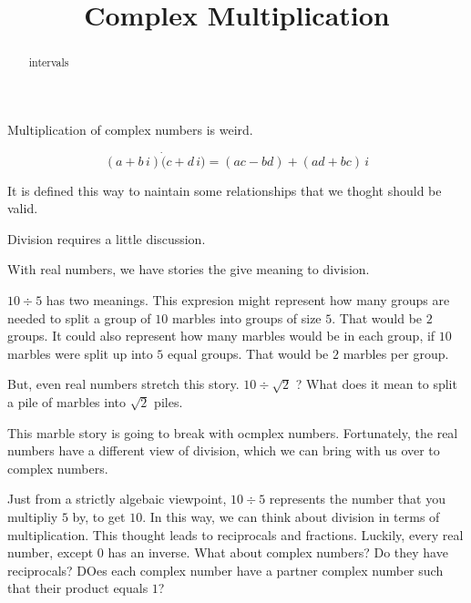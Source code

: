 \documentclass{ximera}
\title{Complex Multiplication}
\begin{document}
\begin{abstract}
intervals
\end{abstract}
\maketitle


Multiplication of complex numbers is weird.





\begin{definition}


\[    (a + b \, i) \dot (c + d \, i) = (ac-bd) + (ad+bc) \, i           \]

\end{definition}


It is defined this way to naintain some relationships that we thoght should be valid.



Division requires a little discussion.



With real numbers, we have stories the give meaning to division.


$10 \div 5$ has two meanings.  This expresion might represent how many groups are needed to split a group of $10$ marbles into groups of size $5$.  That would be $2$ groups.  It could also represent how many marbles would be in each group, if $10$ marbles were split up into $5$ equal groups.  That would be $2$ marbles per group.


But, even real numbers stretch this story.  $10 \div \sqrt{2}$ ?  What does it mean to split a pile of marbles into $\sqrt{2}$ piles.

This marble story is going to break with ocmplex numbers.  Fortunately, the real numbers have a different view of division, which we can bring with us over to complex numbers.





Just from a strictly algebaic viewpoint, $10 \div 5$ represents the number that you multipliy $5$ by, to get $10$.  In this way, we can think about division in terms of multiplication.  This thought leads to reciprocals and fractions.  Luckily, every real number, except $0$ has an inverse.  What about complex numbers?  Do they have reciprocals?  DOes each complex number have a partner complex number such that their product equals $1$?
\end{document}
